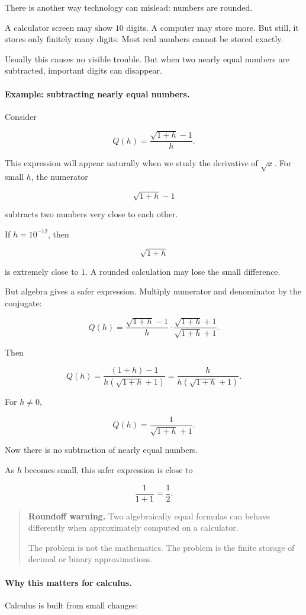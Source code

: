 There is another way technology can mislead: numbers are rounded.

A calculator screen may show \(10\) digits. A computer may store more. But still, it stores only finitely many digits. Most real numbers cannot be stored exactly.

Usually this causes no visible trouble. But when two nearly equal numbers are subtracted, important digits can disappear.

\paragraph{Example: subtracting nearly equal numbers.}
Consider

\[
Q(h)=\frac{\sqrt{1+h}-1}{h}.
\]

This expression will appear naturally when we study the derivative of \(\sqrt{x}\). For small \(h\), the numerator

\[
\sqrt{1+h}-1
\]

subtracts two numbers very close to each other.

If \(h=10^{-12}\), then

\[
\sqrt{1+h}
\]

is extremely close to \(1\). A rounded calculation may lose the small difference.

But algebra gives a safer expression. Multiply numerator and denominator by the conjugate:

\[
Q(h)
=
\frac{\sqrt{1+h}-1}{h}
\cdot
\frac{\sqrt{1+h}+1}{\sqrt{1+h}+1}.
\]

Then

\[
Q(h)
=
\frac{(1+h)-1}{h(\sqrt{1+h}+1)}
=
\frac{h}{h(\sqrt{1+h}+1)}.
\]

For \(h\neq0\),

\[
Q(h)=\frac{1}{\sqrt{1+h}+1}.
\]

Now there is no subtraction of nearly equal numbers.

As \(h\) becomes small, this safer expression is close to

\[
\frac{1}{1+1}=\frac12.
\]

\begin{quote}
\textbf{Roundoff warning.}
Two algebraically equal formulas can behave differently when approximately computed on a calculator.

The problem is not the mathematics. The problem is the finite storage of decimal or binary approximations.
\end{quote}

\paragraph{Why this matters for calculus.}
Calculus is built from small changes:

